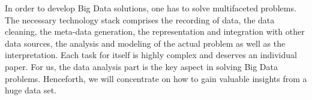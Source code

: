 


In order to develop Big Data solutions, one has to solve multifaceted problems.
The necessary technology stack comprises the recording of data, the data cleaning, the meta-data generation, the representation and integration with other data sources, the analysis and modeling of the actual problem as well as the interpretation.
Each task for itself is highly complex and deserves an individual paper.
For us, the data analysis part is the key aspect in solving Big Data problems.
Henceforth, we will concentrate on how to gain valuable insights from a huge data set.

